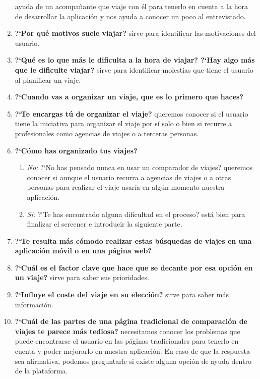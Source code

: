 \begin{enumerate}
                ayuda de un acompañante que viaje con él para tenerlo en cuenta a la hora de desarrollar la aplicación y nos ayuda a conocer un poco al entrevistado.
    \item {\textbf{?`Por qué motivos suele viajar?}} sirve para identificar las motivaciones del usuario.
    \item {\textbf{?`Qué es lo que más le dificulta a la hora de viajar? ?`Hay algo más que le dificulte viajar?}} sirve para identificar molestias que tiene
                el usuario al planificar un viaje.
    \item {\textbf{?`Cuando vas a organizar un viaje, que es lo primero que haces?}}
    \item {\textbf{?`Te encargas tú de organizar el viaje?}} queremos conocer si el usuario tiene la iniciativa para organizar el viaje por sí solo o bien si
                recurre a profesionales como agencias de viajes o a terceras personas.
    \item{ \textbf{?`Cómo has organizado tus viajes?}}
    \begin{enumerate}
        \item {\textit{No:}} ?`No has pensado nunca en usar un comparador de viajes? queremos conocer si aunque el usuario recurra a agencias de viajes o
                        a otras personas para realizar el viaje usaría en algún momento nuestra aplicación.
        \item {\textit{Si:}} ?`Te has encontrado alguna dificultad en el proceso? está bien para finalizar el screener e introducir la siguiente parte.
    \end{enumerate}
    \item {\textbf{?`Te resulta más cómodo realizar estas búsquedas de viajes en una aplicación móvil o en una página web?}}
    \item {\textbf{?`Cuál es el factor clave que hace que se decante por esa opción en un viaje?}} sirve para saber sus prioridades.
    \item {\textbf{?`Influye el coste del viaje en su elección?}} sirve para saber más información.
    \item {\textbf{?`Cuál de las partes de una página tradicional de comparación de viajes te parece más tediosa?}} necesitamos conocer los problemas que
                puede encontrarse el usuario en las páginas tradicionales para tenerlo en cuenta y poder mejorarlo en nuestra aplicación. En caso de que
                la respuesta sea afirmativa, podemos preguntarle si existe alguna opción de ayuda dentro de la plataforma.

\end{enumerate}
